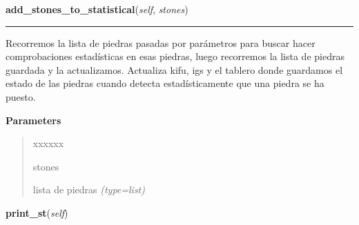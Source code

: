     \label{src:goban:Goban:add_stones_to_statistical}

    \vspace{0.5ex}

\hspace{.8\funcindent}\begin{boxedminipage}{\funcwidth}

    \raggedright \textbf{add\_stones\_to\_statistical}(\textit{self}, \textit{stones})

    \vspace{-1.5ex}

    \rule{\textwidth}{0.5\fboxrule}
\setlength{\parskip}{2ex}
Recorremos la lista de piedras pasadas por parámetros para buscar hacer comprobaciones estadísticas en esas piedras, luego recorremos la lista de piedras guardada y la actualizamos. Actualiza kifu, igs y el tablero donde guardamos el estado de las piedras cuando detecta estadísticamente que una piedra se ha puesto.

\setlength{\parskip}{1ex}
      \textbf{Parameters}
      \vspace{-1ex}

      \begin{quote}
        \begin{Ventry}{xxxxxx}

          \item[stones]


lista de piedras
            {\it (type=list)}

        \end{Ventry}

      \end{quote}

    \end{boxedminipage}

    \label{src:goban:Goban:print_st}

    \vspace{0.5ex}

\hspace{.8\funcindent}\begin{boxedminipage}{\funcwidth}

    \raggedright \textbf{print\_st}(\textit{self})

\setlength{\parskip}{2ex}
\setlength{\parskip}{1ex}
    \end{boxedminipage}

